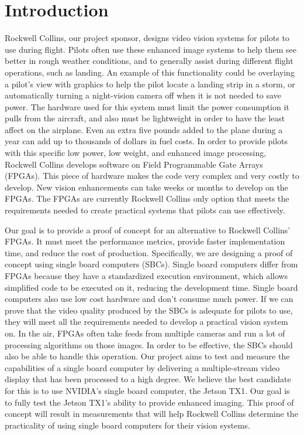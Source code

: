 \documentclass[letterpaper,10pt,titlepage]{IEEEtran}
\begin{document}
   \section{Introduction}
   Rockwell Collins, our project sponsor, designs video vision systems for pilots to use during flight. Pilots often use these enhanced image systems to help them see better in rough weather conditions, and to generally assist during different flight operations, such as landing. An example of this functionality could be overlaying a pilot's view with graphics to help the pilot locate a landing strip in a storm, or automatically turning a night-vision camera off when it is not needed to save power. The hardware used for this system must limit the power consumption it pulls from the aircraft, and also must be lightweight in order to have the least affect on the airplane. Even an extra five pounds added to the plane during a year can add up to thousands of dollars in fuel costs. In order to provide pilots with this specific low power, low weight, and enhanced image processing, Rockwell Collins develops software on Field Programmable Gate Arrays (FPGAs). This piece of hardware makes the code very complex and very costly to develop. New vision enhancements can take weeks or months to develop on the FPGAs. The FPGAs are currently Rockwell Collins only option that meets the requirements needed to create practical systems that pilots can use effectively.\\
\par
   Our goal is to provide a proof of concept for an alternative to Rockwell Collins' FPGAs. It must meet the performance metrics, provide faster implementation time, and reduce the cost of production. Specifically, we are designing a proof of concept using single board computers (SBCs). Single board computers differ from FPGAs because they have a standardized execution environment, which allows simplified code to be executed on it, reducing the development time. Single board computers also use low cost hardware and don't consume much power. If we can prove that the video quality produced by the SBCs is adequate for pilots to use, they will meet all the requirements needed to develop a practical vision system on. In the air, FPGAs often take feeds from multiple cameras and run a lot of processing algorithms on those images. In order to be effective, the SBCs should also be able to handle this operation. Our project aims to test and measure the capabilities of a single board computer by delivering a multiple-stream video display that has been processed to a high degree. We believe the best candidate for this is to use NVIDIA's single board computer, the Jetson TX1. Our goal is to fully test the Jetson TX1's ability to provide enhanced imaging. This proof of concept will result in measurements that will help Rockwell Collins determine the practicality of using single board computers for their vision systems.
   
   
   
\end{document}
